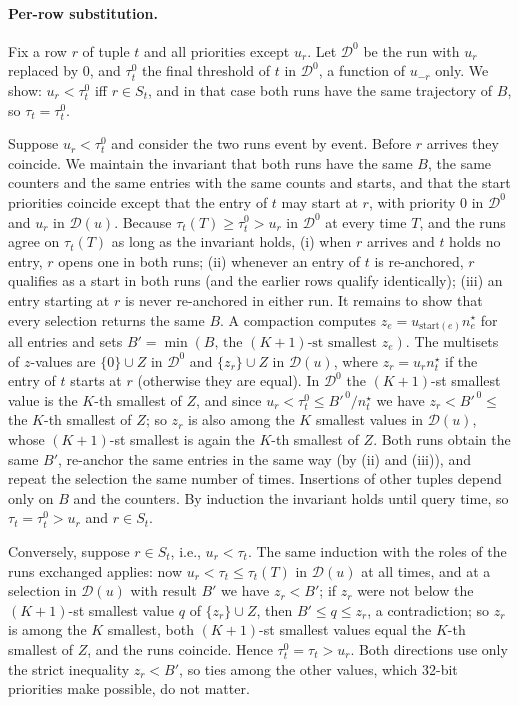 \documentclass[sigconf,review,anonymous]{acmart}
\newcommand{\nstar}{n^{\star}}
\begin{document}
\paragraph{Per-row substitution.} Fix a row $r$ of tuple $t$ and all priorities except $u_r$. Let
$\mathcal D^0$ be the run with $u_r$ replaced by $0$, and $\tau^0_t$ the final threshold of $t$ in
$\mathcal D^0$, a function of $u_{-r}$ only. We show: $u_r<\tau^0_t$ iff $r\in S_t$, and in that case both
runs have the same trajectory of $B$, so $\tau_t=\tau^0_t$.

Suppose $u_r<\tau^0_t$ and consider the two runs event by event. Before $r$ arrives they coincide. We
maintain the invariant that both runs have the same $B$, the same counters and the same entries with the
same counts and starts, and that the start priorities coincide except that the entry of $t$ may start at
$r$, with priority $0$ in $\mathcal D^0$ and $u_r$ in $\mathcal D(u)$. Because $\tau_t(T)\ge\tau^0_t>u_r$ in
$\mathcal D^0$ at every time $T$, and the runs agree on $\tau_t(T)$ as long as the invariant holds, (i) when
$r$ arrives and $t$ holds no entry, $r$ opens one in both runs; (ii) whenever an entry of $t$ is
re-anchored, $r$ qualifies as a start in both runs (and the earlier rows qualify identically); (iii) an
entry starting at $r$ is never re-anchored in either run. It remains to show that every selection returns
the same $B$. A compaction computes $z_e=u_{\mathrm{start}(e)}\nstar_e$ for all entries and sets
$B'=\min(B,\,\text{the }(K{+}1)\text{-st smallest }z_e)$. The multisets of $z$-values are $\{0\}\cup Z$ in
$\mathcal D^0$ and $\{z_r\}\cup Z$ in $\mathcal D(u)$, where $z_r=u_r\nstar_t$ if the entry of $t$ starts at
$r$ (otherwise they are equal). In $\mathcal D^0$ the $(K{+}1)$-st smallest value is the $K$-th smallest
of $Z$, and since $u_r<\tau^0_t\le B'^{\,0}/\nstar_t$ we have $z_r<B'^{\,0}\le$ the $K$-th smallest of $Z$; so
$z_r$ is also among the $K$ smallest values in $\mathcal D(u)$, whose $(K{+}1)$-st smallest is again the
$K$-th smallest of $Z$. Both runs obtain the same $B'$, re-anchor the same entries in the same way (by
(ii) and (iii)), and repeat the selection the same number of times. Insertions of other tuples depend only
on $B$ and the counters. By induction the invariant holds until query time, so $\tau_t=\tau^0_t>u_r$ and
$r\in S_t$.

Conversely, suppose $r\in S_t$, i.e., $u_r<\tau_t$. The same induction with the roles of the runs exchanged
applies: now $u_r<\tau_t\le\tau_t(T)$ in $\mathcal D(u)$ at all times, and at a selection in $\mathcal D(u)$
with result $B'$ we have $z_r<B'$; if $z_r$ were not below the $(K{+}1)$-st smallest value $q$ of
$\{z_r\}\cup Z$, then $B'\le q\le z_r$, a contradiction; so $z_r$ is among the $K$ smallest, both
$(K{+}1)$-st smallest values equal the $K$-th smallest of $Z$, and the runs coincide. Hence
$\tau^0_t=\tau_t>u_r$. Both directions use only the strict inequality $z_r<B'$, so ties among the
other values, which 32-bit priorities make possible, do not matter.
\end{document}
